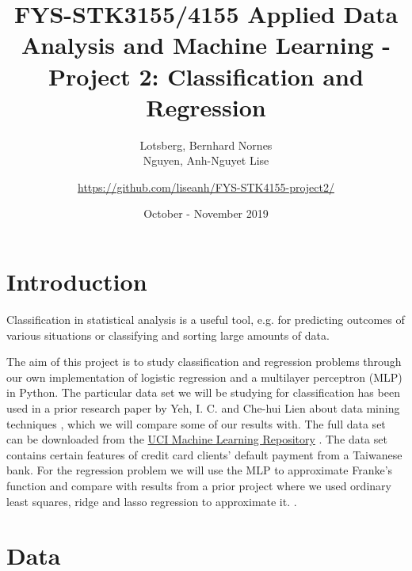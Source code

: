 \documentclass[a4paper, 11pt, twocolumn]{article}
\title{FYS-STK3155/4155 Applied Data Analysis and Machine Learning - Project 2: Classification and Regression }
\author{Lotsberg, Bernhard Nornes \\ Nguyen, Anh-Nguyet Lise \and
\url{https://github.com/liseanh/FYS-STK4155-project2/}}
\date{October - November 2019}
\begin{document}

\section{Introduction}
Classification in statistical analysis is a useful tool, e.g. for predicting
outcomes of various situations or classifying and sorting large amounts of data.

The aim of this project is  to study classification and regression problems
through our own implementation of logistic regression and a multilayer perceptron
(MLP) in Python. The particular data set we will be studying for classification
has been used in a prior research paper by Yeh, I. C. and Che-hui Lien about
data mining techniques \cite{origarticle}, which we will compare some of our
results with.  The full data set can be downloaded from the \href{https://archive.ics.uci.edu/ml/datasets/default+of+credit+card+clients}{UCI Machine
Learning Repository} \cite{UCI}. The data set contains certain features of
credit card clients' default payment from a Taiwanese bank.
For the regression problem we will use the MLP to approximate Franke's function
and compare with results from a prior project where we used ordinary least
squares, ridge and lasso regression to approximate it. \cite{regpaper}.


\section{Data}
\end{document}
